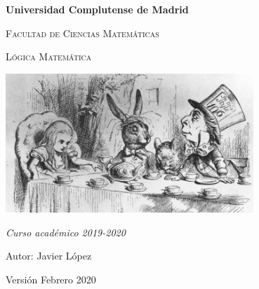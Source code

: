 \begin{titlepage}
\centering
\vspace{1cm}
{\bfseries\LARGE Universidad Complutense de Madrid \par}
\vspace{1cm}
{\scshape\Large Facultad de Ciencias Matemáticas \par}
\vspace{2cm}
{\scshape\Huge Lógica Matemática \par}
\vspace{1cm}
{\includegraphics[width=0.7\textwidth]{alice.jpg}\par}
\vspace{3cm}
{\itshape\Large Curso académico 2019-2020 \par}
\vfill
{\Large Autor: Javier López \par}
\vfill
{\Large Versión Febrero 2020 \par}
\end{titlepage}